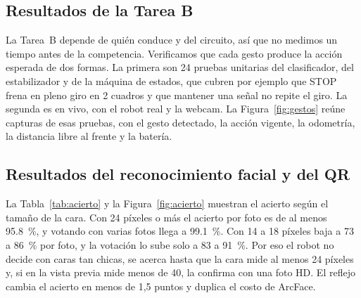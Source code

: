 \documentclass[11pt,a4paper]{article}
\begin{document}
\subsection{Resultados de la Tarea B}

La Tarea~B depende de quién conduce y del circuito, así que no medimos un tiempo antes de la competencia. Verificamos que cada gesto produce la acción esperada de dos formas. La primera son 24 pruebas unitarias del clasificador, del estabilizador y de la máquina de estados, que cubren por ejemplo que STOP frena en pleno giro en 2 cuadros y que mantener una señal no repite el giro. La segunda es en vivo, con el robot real y la webcam. La Figura~\ref{fig:gestos} reúne capturas de esas pruebas, con el gesto detectado, la acción vigente, la odometría, la distancia libre al frente y la batería.

\subsection{Resultados del reconocimiento facial y del QR}
\label{sec:res_cara}

La Tabla~\ref{tab:acierto} y la Figura~\ref{fig:acierto} muestran el acierto según el tamaño de la cara. Con 24 píxeles o más el acierto por foto es de al menos \SI{95,8}{\percent}, y votando con varias fotos llega a \SI{99,1}{\percent}. Con 14 a 18 píxeles baja a \num{73} a \SI{86}{\percent} por foto, y la votación lo sube solo a \num{83} a \SI{91}{\percent}. Por eso el robot no decide con caras tan chicas, se acerca hasta que la cara mide al menos 24 píxeles y, si en la vista previa mide menos de 40, la confirma con una foto HD. El reflejo cambia el acierto en menos de 1,5 puntos y duplica el costo de ArcFace.
\end{document}
